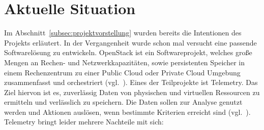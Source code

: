 \section{Aktuelle Situation}
Im Abschnitt~\ref{subsec:projektvorstellung} wurden bereits die Intentionen des
Projekts erläutert. In der Vergangenheit wurde schon mal versucht eine passende
Softwarelösung zu entwickeln. OpenStack ist ein Softwareprojekt, welches große
Mengen an Rechen- und Netzwerkkapazitäten, sowie persistenten Speicher in einem
Rechenzentrum zu einer \gls{Public Cloud} oder \gls{Private Cloud} Umgebung
zusammenfasst und orchestriert (vgl.~\cite{OpenStack_Intro}). Eines der
Teilprojekte ist Telemetry. Das Ziel hiervon ist es, zuverlässig Daten von
physischen und virtuellen Ressourcen zu ermitteln und verlässlich zu speichern.
Die Daten sollen zur Analyse genutzt werden und Aktionen auslösen, wenn
bestimmte Kriterien erreicht sind (vgl.~\cite{OpenStack_Telemetry}). Telemetry
bringt leider mehrere Nachteile mit sich:


